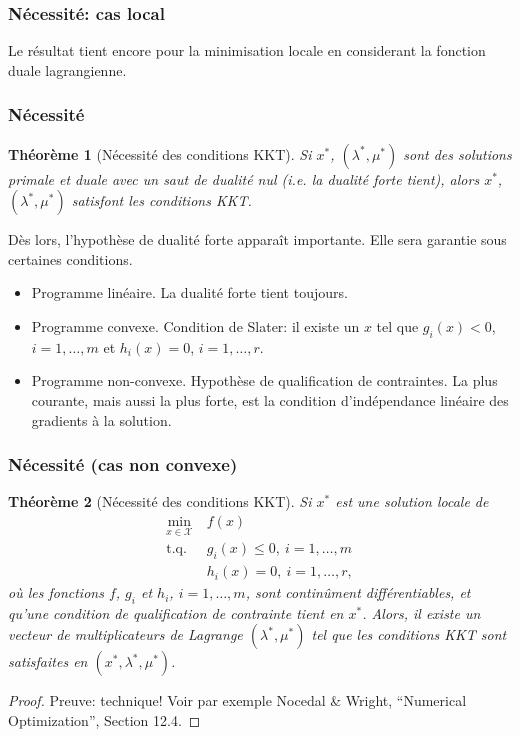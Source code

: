 \documentclass[usepdftitle=false]{beamer}
\newtheorem{thm}{Théorème}
\def\cX{\mathcal{X}}
\begin{document}
\begin{frame}
\frametitle{Nécessité: cas local}

Le résultat tient encore pour la minimisation locale en considerant la fonction duale lagrangienne. 

\end{frame}

\begin{frame}
\frametitle{Nécessité}

\begin{thm}[Nécessité des conditions KKT]
Si $x^*$, $(\lambda^*, \mu^*)$ sont des solutions primale et duale avec un saut de dualité nul (i.e. la dualité forte tient),
alors $x^*$, $(\lambda^*, \mu^*)$ satisfont les conditions KKT.
\end{thm}

\mbox{}

Dès lors, l'hypothèse de dualité forte apparaît importante. Elle sera garantie sous certaines conditions.
\begin{itemize}
\item
Programme linéaire. La dualité forte tient toujours.
\item
Programme convexe. Condition de Slater: il existe un $x$ tel que $g_i(x) < 0$, $i = 1,\ldots,m$ et $h_i(x) = 0$, $i = 1,\ldots,r$.
\item
Programme non-convexe.
Hypothèse de qualification de contraintes.
La plus courante, mais aussi la plus forte, est la condition d'indépendance linéaire des gradients à la solution.
\end{itemize}

\end{frame}

\begin{frame}
\frametitle{Nécessité (cas non convexe)}

\begin{thm}[Nécessité des conditions KKT]
Si $x^*$ est une solution locale de
\begin{align*}
\min_{x \in \cX} \ & f(x) \\
\mbox{t.q. } & g_i(x) \leq 0,\ i = 1,\ldots,m \\
& h_i(x) = 0,\ i = 1,\ldots,r,
\end{align*}
où les fonctions $f$, $g_i$ et $h_i$, $i = 1,\ldots,m$, sont continûment différentiables, et qu'une condition de qualification de contrainte tient en $x^*$.
Alors, il existe un vecteur de multiplicateurs de Lagrange  $(\lambda^*, \mu^*)$ tel que les conditions KKT sont satisfaites en $(x^*,\lambda^*, \mu^*)$.
\end{thm}

\begin{proof}
Preuve: technique!
Voir par exemple Nocedal \& Wright, ``Numerical Optimization'', Section 12.4.
\end{proof}

\end{frame}
\end{document}
